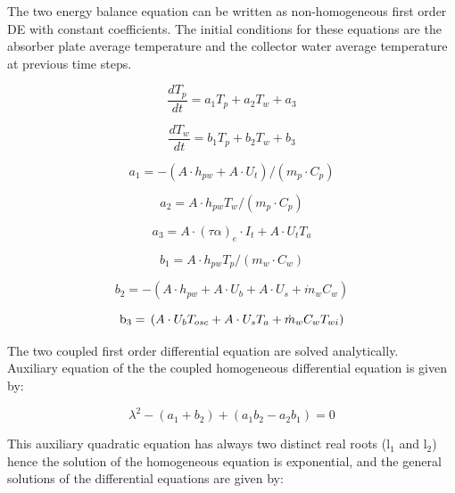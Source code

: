 The two energy balance equation can be written as non-homogeneous first order DE with constant coefficients. The initial conditions for these equations are the absorber plate average temperature and the collector water average temperature at previous time steps.

\begin{equation}
\frac{{d{T_p}}}{{dt}} = {a_1}{T_p} + {a_2}{T_w} + {a_3}
\end{equation}

\begin{equation}
\frac{{d{T_w}}}{{dt}} = {b_1}{T_p} + {b_2}{T_w} + {b_3}
\end{equation}

\begin{equation}
{a_1} =  - \left( {A \cdot {h_{pw}} + A \cdot {U_t}} \right)/\left( {{m_p} \cdot {C_p}} \right)
\end{equation}

\begin{equation}
{a_2} = A \cdot {h_{pw}}{T_w}/\left( {{m_p} \cdot {C_p}} \right)
\end{equation}

\begin{equation}
{a_3} = A \cdot {\left( {\tau \alpha } \right)_e} \cdot {I_t} + A \cdot {U_t}{T_a}
\end{equation}

\begin{equation}
{b_1} = A \cdot {h_{pw}}{T_p}/\left( {{m_w} \cdot {C_w}} \right)
\end{equation}

\begin{equation}
{b_2} =  - \left( {A \cdot {h_{pw}} + A \cdot {U_b} + A \cdot {U_s} + {{\dot m}_w}{C_w}} \right)
\end{equation}

\begin{equation}
{{\rm{b}}_{\rm{3}}} = {\rm{ }}\left( {A \cdot {U_b}{T_{osc}} + A \cdot {U_s}{T_a} + {{\dot m}_w}{C_w}{T_{wi}}} \right)
\end{equation}

The two coupled first order differential equation are solved analytically.~ Auxiliary equation of the the coupled homogeneous differential equation is given by:

\begin{equation}
{\lambda ^2} - ({a_1} + {b_2}) + ({a_1}{b_2} - {a_2}{b_1}) = 0
\end{equation}

This auxiliary quadratic equation has always two distinct real roots (l\(_{1}\) and l\(_{2}\)) hence the solution of the homogeneous equation is exponential, and the general solutions of the differential equations are given by:

